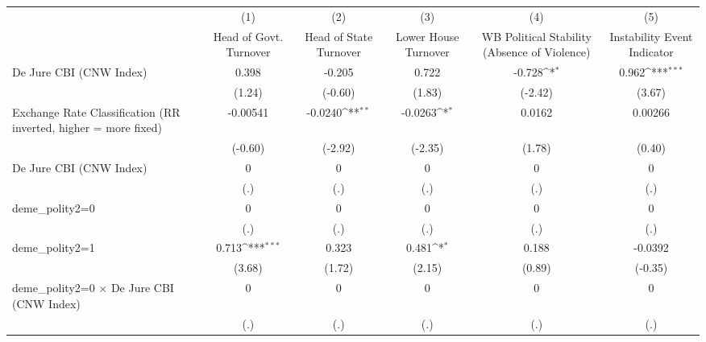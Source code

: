 {
\def\sym#1{\ifmmode^{#1}\else\(^{#1}\)\fi}
\begin{tabular*}{\linewidth}{@{\hskip\tabcolsep\extracolsep\fill}l*{5}{c}}
\hline\hline
                &\multicolumn{1}{c}{(1)}&\multicolumn{1}{c}{(2)}&\multicolumn{1}{c}{(3)}&\multicolumn{1}{c}{(4)}&\multicolumn{1}{c}{(5)}\\
                &\multicolumn{1}{c}{Head of Govt. Turnover}&\multicolumn{1}{c}{Head of State Turnover}&\multicolumn{1}{c}{Lower House Turnover}&\multicolumn{1}{c}{WB Political Stability (Absence of Violence)}&\multicolumn{1}{c}{Instability Event Indicator}\\
\hline
De Jure CBI (CNW Index)&    0.398         &   -0.205         &    0.722         &   -0.728\sym{*}  &    0.962\sym{***}\\
                &   (1.24)         &  (-0.60)         &   (1.83)         &  (-2.42)         &   (3.67)         \\
[1em]
Exchange Rate Classification (RR inverted, higher = more fixed)& -0.00541         &  -0.0240\sym{**} &  -0.0263\sym{*}  &   0.0162         &  0.00266         \\
                &  (-0.60)         &  (-2.92)         &  (-2.35)         &   (1.78)         &   (0.40)         \\
[1em]
De Jure CBI (CNW Index)&        0         &        0         &        0         &        0         &        0         \\
                &      (.)         &      (.)         &      (.)         &      (.)         &      (.)         \\
[1em]
deme\_polity2=0  &        0         &        0         &        0         &        0         &        0         \\
                &      (.)         &      (.)         &      (.)         &      (.)         &      (.)         \\
[1em]
deme\_polity2=1  &    0.713\sym{***}&    0.323         &    0.481\sym{*}  &    0.188         &  -0.0392         \\
                &   (3.68)         &   (1.72)         &   (2.15)         &   (0.89)         &  (-0.35)         \\
[1em]
deme\_polity2=0 $\times$ De Jure CBI (CNW Index)&        0         &        0         &        0         &        0         &        0         \\
                &      (.)         &      (.)         &      (.)         &      (.)         &      (.)         \\

\end{tabular*}}
